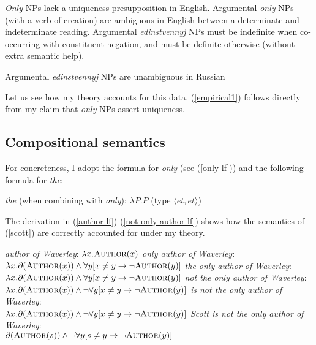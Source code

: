 \begin{exe}
	\ex \label{empirical1} \textit{Only} NPs lack a uniqueness presupposition in English.
	\ex \label{empirical2} Argumental \textit{only} NPs (with a verb of creation) are ambiguous in English between a determinate and indeterminate reading.
	\ex \label{empirical3} Argumental \textit{edinstvennyj} NPs must be indefinite when co-occurring with constituent negation, and must be definite otherwise (without extra semantic help).
	
	\ex \label{empirical4} Argumental \textit{edinstvennyj} NPs are unambiguous in Russian
\end{exe}

Let us see how my theory accounts for this data. (\ref{empirical1}) follows directly from my claim that \textit{only} NPs assert uniqueness.

\subsection{Compositional semantics}

For concreteness, I adopt the  formula for \textit{only} (see (\ref{only-lf})) and the following formula for \textit{the}:

\begin{exe}
	\ex \textit{the} (when combining with \textit{only}): $\lambda P . P$ (type $\langle et, et \rangle$)
\end{exe}

The derivation in (\ref{author-lf})-(\ref{not-only-author-lf}) shows how the semantics of (\ref{scott}) are correctly accounted for under my theory.

\begin{exe}
	\ex \label{author-lf} \textit{author of Waverley}: $\lambda x . \textsc{Author}(x)$
	\ex \textit{only author of Waverley}: $\lambda x . \partial(\textsc{Author}(x)) \land \forall y [ x \ne y \to \neg \textsc{Author}(y) ]$
	\ex \textit{the only author of Waverley}: $\lambda x . \partial(\textsc{Author}(x)) \land \forall y [ x \ne y \to \neg \textsc{Author}(y) ]$
	\ex \textit{not the only author of Waverley}: \\ $\lambda x . \partial(\textsc{Author}(x)) \land \neg  \forall y [ x \ne y \to \neg \textsc{Author}(y) ]$
	\ex \textit{is not the only author of Waverley}: \\ $\lambda x . \partial(\textsc{Author}(x)) \land \neg  \forall y [ x \ne y \to \neg \textsc{Author}(y) ]$
	\ex \label{not-only-author-lf} \textit{Scott is not the only author of Waverley}: \\ $\partial(\textsc{Author}(s)) \land \neg \forall y [ s \ne y \to \neg \textsc{Author}(y) ]$
\end{exe}

